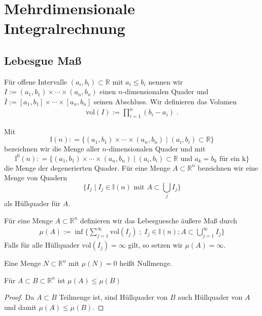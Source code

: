 
\section{Mehrdimensionale Integralrechnung}

\subsection{Lebesgue Maß}

Für offene Intervalle $(a_i,b_i) \subset \mathbb{R}$ mit $a_i \leq b_i$ nennen wir $I := (a_1,b_1) \times \cdots \times (a_n,b_n)$ einen $n$-dimensionalen Quader 
und $\bar{I}:= [a_1, b_1] \times \cdots \times [a_n,b_n]$ seinen Abschluss. Wir definieren das Volumen 
\begin{align*}
\text{vol} (I):=   \prod_{i = 1}^n (b_i -a_i)  \; .
\end{align*}

Mit 
$$\mathbb{I}(n): = \{   (a_1,b_1) \times \cdots \times (a_n,b_n) \; | \;  (a_i, b_i) \subset \mathbb{R} \}$$
 bezeichnen wir die Menge aller $n$-dimensionalen Quader und mit
$$\mathbb{I}^0(n): = \{   (a_1,b_1) \times \cdots \times (a_n,b_n) \; | \;  (a_i, b_i) \subset \mathbb{R}  \text { und } a_k = b_k \text{ für ein k}\}$$ 
die Menge der degenerierten Quader.   Für eine Menge $A \subset \mathbb{R}^n$ bezeichnen wir eine Menge von Quadern 
$$ \biggl \{ I_j \; | \;  I_j \in \mathbb{I}(n)   \text{ mit } A \subset \bigcup_j I_j  \biggr \}$$ als Hüllquader für $A$.
\begin{Definition}
Für eine Menge $A \subset \mathbb{R}^n$ definieren wir das Lebesguesche äußere Maß durch 
\begin{align*}
\mu (A):=   \inf \biggl \{ \sum_{j=1}^{\infty}   \text{vol} (I_j)\; ; \; I_j \in \mathbb{I}(n); A \subset \bigcup_{j= 1}^{\infty} I_j \biggr \} 
\end{align*}
Falls für alle Hüllquader $\text{vol} (I_j) = \infty$ gilt, so setzen wir $\mu (A) = \infty$.
\end{Definition}

\begin{Definition}
\end{Definition}

\begin{Definition}[Nullmenge]
Eine Menge $N \subset \mathbb{R}^n$ mit $\mu (N) = 0$ heißt Nullmenge.
\end{Definition}


\begin{Bemerkung}
\label{massmonton}
Für $A \subset B \subset \mathbb{R}^n$ ist $\mu(A) \leq \mu(B)$
\end{Bemerkung}
\begin{proof}
Da $A \subset B$ Teilmenge ist, sind Hüllquader von $B$  auch Hüllquader von $A$ und damit  $\mu(A) \leq \mu(B)$.
\end{proof}

